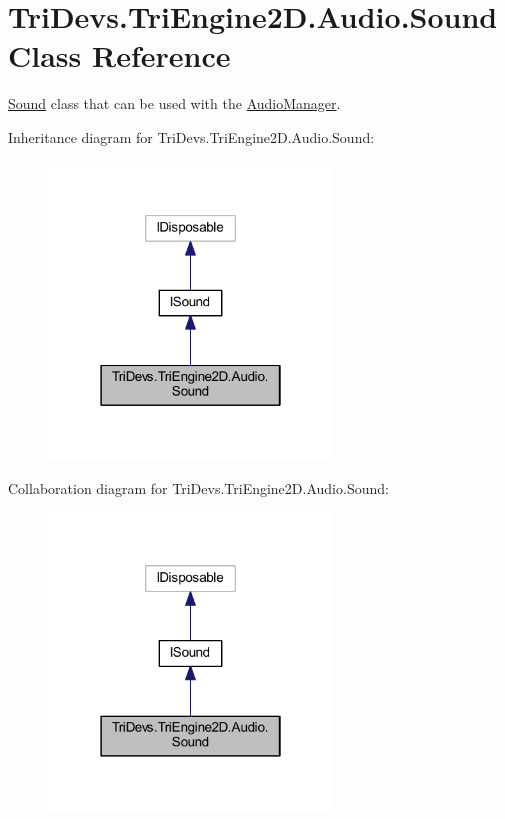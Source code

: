 \hypertarget{class_tri_devs_1_1_tri_engine2_d_1_1_audio_1_1_sound}{\section{Tri\-Devs.\-Tri\-Engine2\-D.\-Audio.\-Sound Class Reference}
\label{class_tri_devs_1_1_tri_engine2_d_1_1_audio_1_1_sound}
}


\hyperlink{class_tri_devs_1_1_tri_engine2_d_1_1_audio_1_1_sound}{Sound} class that can be used with the \hyperlink{class_tri_devs_1_1_tri_engine2_d_1_1_audio_1_1_audio_manager}{Audio\-Manager}.  




Inheritance diagram for Tri\-Devs.\-Tri\-Engine2\-D.\-Audio.\-Sound\-:\nopagebreak
\begin{figure}[H]
\begin{center}
\leavevmode
\includegraphics[width=214pt]{class_tri_devs_1_1_tri_engine2_d_1_1_audio_1_1_sound__inherit__graph}
\end{center}
\end{figure}


Collaboration diagram for Tri\-Devs.\-Tri\-Engine2\-D.\-Audio.\-Sound\-:\nopagebreak
\begin{figure}[H]
\begin{center}
\leavevmode
\includegraphics[width=214pt]{class_tri_devs_1_1_tri_engine2_d_1_1_audio_1_1_sound__coll__graph}
\end{center}
\end{figure}
